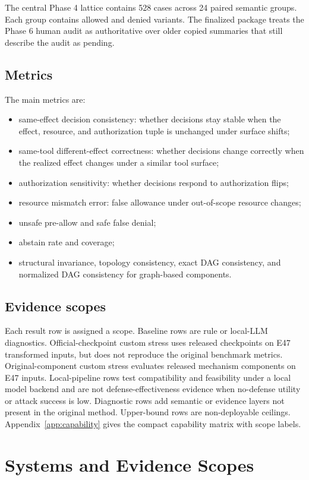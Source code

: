 \documentclass[11pt]{article}
\begin{document}
The central Phase 4 lattice contains 528 cases across 24 paired semantic groups. Each group contains allowed and denied variants. The finalized package treats the Phase 6 human audit as authoritative over older copied summaries that still describe the audit as pending.

\subsection{Metrics}
The main metrics are:
\begin{itemize}[leftmargin=*]
  \item same-effect decision consistency: whether decisions stay stable when the effect, resource, and authorization tuple is unchanged under surface shifts;
  \item same-tool different-effect correctness: whether decisions change correctly when the realized effect changes under a similar tool surface;
  \item authorization sensitivity: whether decisions respond to authorization flips;
  \item resource mismatch error: false allowance under out-of-scope resource changes;
  \item unsafe pre-allow and safe false denial;
  \item abstain rate and coverage;
  \item structural invariance, topology consistency, exact DAG consistency, and normalized DAG consistency for graph-based components.
\end{itemize}

\subsection{Evidence scopes}
Each result row is assigned a scope. Baseline rows are rule or local-LLM diagnostics. Official-checkpoint custom stress uses released checkpoints on E47 transformed inputs, but does not reproduce the original benchmark metrics. Original-component custom stress evaluates released mechanism components on E47 inputs. Local-pipeline rows test compatibility and feasibility under a local model backend and are not defense-effectiveness evidence when no-defense utility or attack success is low. Diagnostic rows add semantic or evidence layers not present in the original method. Upper-bound rows are non-deployable ceilings. Appendix~\ref{app:capability} gives the compact capability matrix with scope labels.

\section{Systems and Evidence Scopes}
\end{document}
